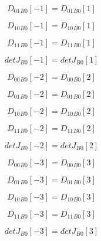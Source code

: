 \documentclass{article}
\begin{document}
\begin{dmath}{D_{01}{_{B0}}}[{-1}] = {D_{01}{_{B0}}}[{1}]\end{dmath}

\begin{dmath}{D_{10}{_{B0}}}[{-1}] = {D_{10}{_{B0}}}[{1}]\end{dmath}

\begin{dmath}{D_{11}{_{B0}}}[{-1}] = {D_{11}{_{B0}}}[{1}]\end{dmath}

\begin{dmath}{detJ{_{B0}}}[{-1}] = {detJ{_{B0}}}[{1}]\end{dmath}

\begin{dmath}{D_{00}{_{B0}}}[{-2}] = {D_{00}{_{B0}}}[{2}]\end{dmath}

\begin{dmath}{D_{01}{_{B0}}}[{-2}] = {D_{01}{_{B0}}}[{2}]\end{dmath}

\begin{dmath}{D_{10}{_{B0}}}[{-2}] = {D_{10}{_{B0}}}[{2}]\end{dmath}

\begin{dmath}{D_{11}{_{B0}}}[{-2}] = {D_{11}{_{B0}}}[{2}]\end{dmath}

\begin{dmath}{detJ{_{B0}}}[{-2}] = {detJ{_{B0}}}[{2}]\end{dmath}

\begin{dmath}{D_{00}{_{B0}}}[{-3}] = {D_{00}{_{B0}}}[{3}]\end{dmath}

\begin{dmath}{D_{01}{_{B0}}}[{-3}] = {D_{01}{_{B0}}}[{3}]\end{dmath}

\begin{dmath}{D_{10}{_{B0}}}[{-3}] = {D_{10}{_{B0}}}[{3}]\end{dmath}

\begin{dmath}{D_{11}{_{B0}}}[{-3}] = {D_{11}{_{B0}}}[{3}]\end{dmath}

\begin{dmath}{detJ{_{B0}}}[{-3}] = {detJ{_{B0}}}[{3}]\end{dmath}
\end{document}
